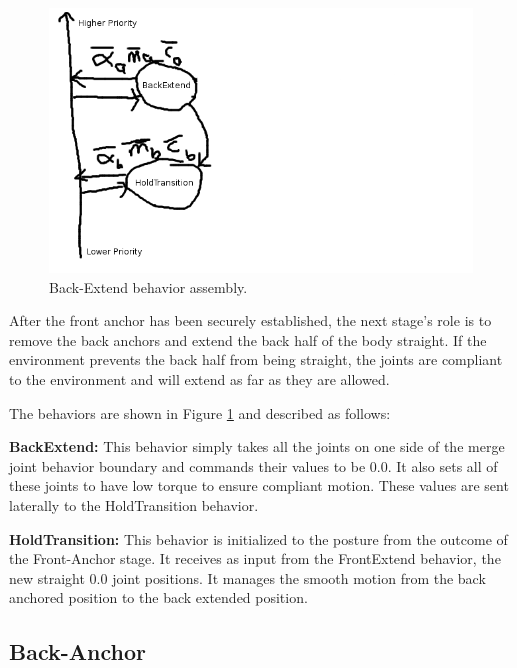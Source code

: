 \begin{figure}
\begin{center}
\includegraphics[scale=0.5]{2_adaptive_3.png}
\end{center}
\caption{Back-Extend behavior assembly.}
\label{adaptive3}
\end{figure}


After the front anchor has been securely established, the next stage’s role is to remove the back anchors and extend the back half of the body straight.  If the environment prevents the back half from being straight, the joints are compliant to the environment and will extend as far as they are allowed.

The behaviors are shown in Figure \ref{adaptive3} and described as follows:

\textbf{BackExtend:}
This behavior simply takes all the joints on one side of the merge joint behavior boundary and commands their values to be 0.0.  It also sets all of these joints to have low torque to ensure compliant motion.  These values are sent laterally to the HoldTransition behavior.

\textbf{HoldTransition:} 
This behavior is initialized to the posture from the outcome of the Front-Anchor stage.  It receives as input from the FrontExtend behavior, the new straight 0.0 joint positions.  It manages the smooth motion from the back anchored position to the back extended position.


\subsection{Back-Anchor}

